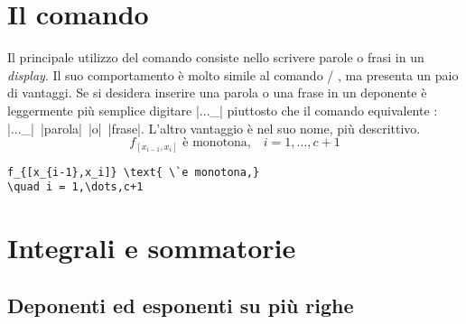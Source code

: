 \documentclass[a4paper,leqno,titlepage,openany]{amsldoc}[1999/12/13]
\begin{document}

\chapter{Il comando }\label{text}

Il principale utilizzo del comando  consiste nello scrivere
parole o frasi in un
\emph{display}. Il suo comportamento \`e molto simile al comando
\latex/  , ma presenta un paio di vantaggi. Se si desidera
inserire una parola o una frase in un deponente \`e leggermente pi\`u
semplice digitare |..._{}| piuttosto che il
comando equivalente : |..._{\mbox{\scriptsize| |parola| |o|
|frase}}|. L'altro vantaggio \`e nel suo nome, pi\`u descrittivo.
\begin{equation}
f_{[x_{i-1},x_i]} \text{ \`e monotona,}
\quad i = 1,\dots,c+1
\end{equation}
\begin{verbatim}
f_{[x_{i-1},x_i]} \text{ \`e monotona,}
\quad i = 1,\dots,c+1
\end{verbatim}


\chapter{Integrali e sommatorie}

\section{Deponenti ed esponenti su pi\`u righe}
\end{document}
